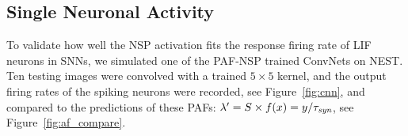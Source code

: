 	
	\subsection{Single Neuronal Activity}
	\label{subsec:compareAF}
	To validate how well the NSP activation fits the response firing rate of LIF neurons in SNNs, we simulated one of the PAF-NSP trained ConvNets on NEST.
	Ten testing images were convolved with a trained $5\times5$ kernel, and the output firing rates of the spiking neurons were recorded, see Figure~\ref{fig:cnn}, and compared to the predictions of these PAFs: $\lambda' = S \times f(x) = y/\tau_{\textit{\textrm{syn}}}$, see Figure~\ref{fig:af_compare}.
	
